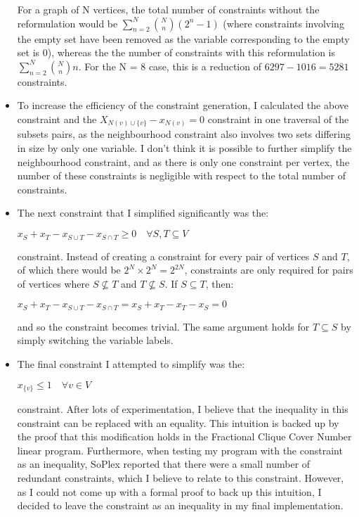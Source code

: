 \documentclass[a4paper]{article}
\begin{document}
\begin{itemize}
For a graph of N vertices, the total number of constraints without the reformulation would be $\sum_{n=2}^N \binom{N}{n}(2^n - 1)$ (where constraints involving the empty set have been removed as the variable corresponding to the empty set is 0), whereas the the number of constraints with this reformulation is $\sum_{n=2}^N \binom{N}{n}n$. For the N = 8 case, this is a reduction of $6297 - 1016 = 5281$ constraints.
\item To increase the efficiency of the constraint generation, I calculated the above constraint and the $X_{N(v) \cup \{v\}} - x_{N(v)} = 0$ constraint in one traversal of the subsets pairs, as the neighbourhood constraint also involves two sets differing in size by only one variable. I don't think it is possible to further simplify the neighbourhood constraint, and as there is only one constraint per vertex, the number of these constraints is negligible with respect to the total number of constraints. 
\item The next constraint that I simplified significantly was the:
\begin{center}
$x_S + x_T - x_{S\cup T} - x_{S\cap T} \geq 0 \quad \forall S, T \subseteq V$
\end{center}
constraint. Instead of creating a constraint for every pair of vertices $S$ and $T$, of which there would be $2^N \times 2^N = 2^{2N}$, constraints are only required for pairs of vertices where $S \not\subseteq T$ and $T \not\subseteq S$. If $S \subseteq T$, then:
\begin{center}
$x_S + x_T - x_{S\cup T} - x_{S\cap T} = x_S + x_T - x_T - x_S = 0$
\end{center}
and so the constraint becomes trivial. The same argument holds for $T \subseteq S$ by simply switching the variable labels.
\item The final constraint I attempted to simplify was the:
\begin{center}
$x_{\{v\}} \leq 1 \quad \forall v \in V$
\end{center}
constraint. After lots of experimentation, I believe that the inequality in this constraint can be replaced with an equality. This intuition is backed up by the proof that this modification holds in the Fractional Clique Cover Number linear program. Furthermore, when testing my program with the constraint as an inequality, SoPlex reported that there were a small number of redundant constraints, which I believe to relate to this constraint. However, as I could not come up with a formal proof to back up this intuition, I decided to leave the constraint as an inequality in my final implementation. 
\end{itemize}
\end{document}
